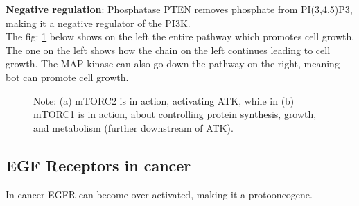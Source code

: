 \documentclass[../main.tex]{subfiles}
\begin{document}
\textbf{Negative regulation}: Phosphatase \gls{PTEN} removes phosphate from PI(3,4,5)P3, making it a negative regulator of the PI3K. \\

The fig: \ref{fig:PI3K} below shows on the left the entire pathway which promotes cell growth. The one on the left shows how the chain on the left continues leading to cell growth. The \gls{MAP} kinase can also go down the pathway on the right, meaning bot can promote cell growth.
\begin{figure}[H]
	\centering
	\hfill
	\caption{Note: (a) mTORC2 is in action, activating ATK, while in (b) \gls{mTORC1} is in action, about controlling protein synthesis, growth, and metabolism (further downstream of ATK).}
	\label{fig:PI3K}
\end{figure}


\subsection{EGF Receptors in cancer}

In cancer \gls{EGFR} can become over-activated, making it a \gls{protooncogene}.
\end{document}
